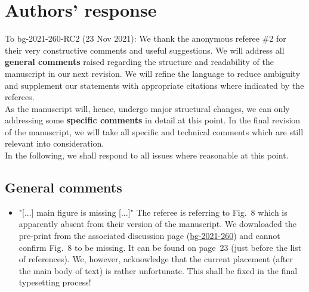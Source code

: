 \documentclass{scrartcl}
\begin{document}
\section*{Authors' response}
To bg-2021-260-RC2 (23 Nov 2021):
We thank the anonymous referee \#2 for their very constructive comments and useful suggestions.
We will address all \textbf{general comments} raised regarding the structure and readability of the manuscript in our next revision. We will refine the language to reduce ambiguity and supplement our statements with appropriate citations where indicated by the referees.\\
As the manuscript will, hence, undergo major structural changes, we can only addressing some \textbf{specific comments} in detail at this point. In the final revision of the manuscript, we will take all specific and technical comments which are still relevant into consideration.\\
In the following, we shall respond to all issues where reasonable at this point.
\subsection*{General comments}
\begin{itemize}
    
    \item {\color{blue} "[...] main figure is missing [...]"} The referee is referring to Fig.~8 which is apparently absent from their version of the manuscript. We downloaded the pre-print from the associated discussion page (\href{https://bg.copernicus.org/preprints/bg-2021-260/}{bg-2021-260}) and cannot confirm Fig.~8 to be missing. It can be found on page~23 (just before the list of references). We, however, acknowledge that the current placement (after the main body of text) is rather unfortunate. This shall be fixed in the final typesetting process!

\end{itemize}
\end{document}
